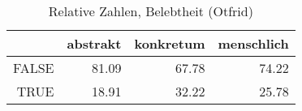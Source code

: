 \begin{table}[ht]
\centering
\begin{tabular}{rrrr}
  \hline
 & abstrakt & konkretum & menschlich \\ 
  \hline
FALSE & 81.09 & 67.78 & 74.22 \\ 
  TRUE & 18.91 & 32.22 & 25.78 \\ 
   \hline
\end{tabular}
\caption{Relative Zahlen, Belebtheit  (Otfrid)} 
\end{table}
